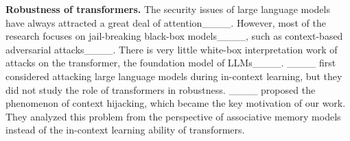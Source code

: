 \textbf{Robustness of transformers.}
The security issues of large language models have always attracted a great deal of attention____. However, most of the research focuses on jail-breaking black-box models____, such as context-based adversarial attacks____. There is very little white-box interpretation work of attacks on the transformer, the foundation model of LLMs____. 
____ first considered attacking large language models during in-context learning, but they did not study the role of transformers in robustness. 
____ proposed the phenomenon of context hijacking, which became the key motivation of our work. They analyzed this problem from the perspective of associative memory models instead of the in-context learning ability of transformers.%